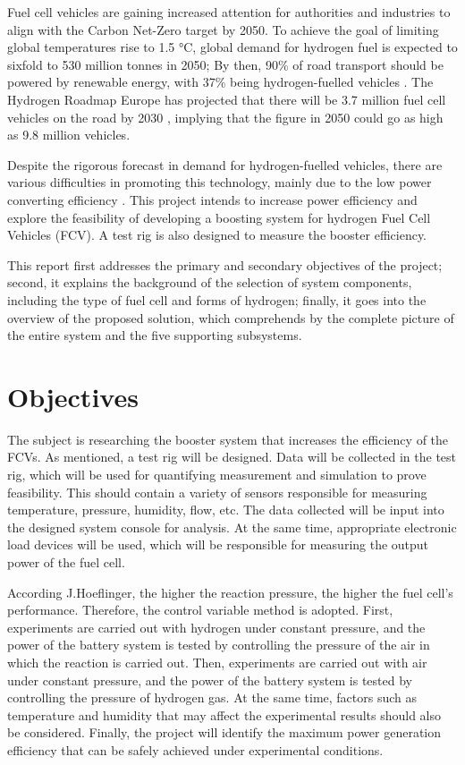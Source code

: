 \documentclass[a4paper,11pt]{article}
\begin{document}
Fuel cell vehicles are gaining increased attention for authorities and industries to align with the Carbon Net-Zero target by 2050. To achieve the goal of limiting global temperatures rise to 1.5 °C, global demand for hydrogen fuel is expected to sixfold to 530 million tonnes in 2050; By then, 90\% of road transport should be powered by renewable energy, with 37\% being hydrogen-fuelled vehicles \cite{IEA2021netzero}. The Hydrogen Roadmap Europe has projected that there will be 3.7 million fuel cell vehicles on the road by 2030 \cite{FCHJU2019roadmap}, implying that the figure in 2050 could go as high as 9.8 million vehicles. 

Despite the rigorous forecast in demand for hydrogen-fuelled vehicles, there are various difficulties in promoting this technology, mainly due to the low power converting efficiency \cite{doe2006factsheet}. This project intends to increase power efficiency and explore the feasibility of developing a boosting system for hydrogen Fuel Cell Vehicles (FCV). A test rig is also designed to measure the booster efficiency. 

This report first addresses the primary and secondary objectives of the project; second, it explains the background of the selection of system components, including the type of fuel cell and forms of hydrogen; finally, it goes into the overview of the proposed solution, which comprehends by the complete picture of the entire system and the five supporting subsystems.

\section{Objectives}

The subject is researching the booster system that increases the efficiency of the FCVs. As mentioned, a test rig will be designed. Data will be collected in the test rig, which will be used for quantifying measurement and simulation to prove feasibility. This should contain a variety of sensors responsible for measuring temperature, pressure, humidity, flow, etc. The data collected will be input into the designed system console for analysis. At the same time, appropriate electronic load devices will be used, which will be responsible for measuring the output power of the fuel cell.

According J.Hoeflinger\cite{hoeflinger2020air}, the higher the reaction pressure, the higher the fuel cell's performance. Therefore, the control variable method is adopted. First, experiments are carried out with hydrogen under constant pressure, and the power of the battery system is tested by controlling the pressure of the air in which the reaction is carried out. Then, experiments are carried out with air under constant pressure, and the power of the battery system is tested by controlling the pressure of hydrogen gas. At the same time, factors such as temperature and humidity that may affect the experimental results should also be considered. Finally, the project will identify the maximum power generation efficiency that can be safely achieved under experimental conditions.
\end{document}
